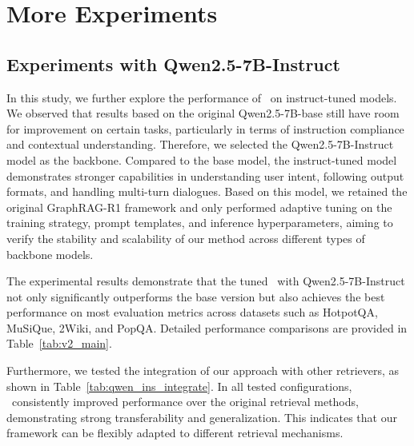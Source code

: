 








\section{More Experiments}

\subsection{Experiments with Qwen2.5-7B-Instruct}
In this study, we further explore the performance of \methodname~on instruct-tuned models. We observed that results based on the original Qwen2.5-7B-base still have room for improvement on certain tasks, particularly in terms of instruction compliance and contextual understanding. Therefore, we selected the Qwen2.5-7B-Instruct model as the backbone. Compared to the base model, the instruct-tuned model demonstrates stronger capabilities in understanding user intent, following output formats, and handling multi-turn dialogues. Based on this model, we retained the original GraphRAG-R1 framework and only performed adaptive tuning on the training strategy, prompt templates, and inference hyperparameters, aiming to verify the stability and scalability of our method across different types of backbone models.

The experimental results demonstrate that the tuned \methodname~with Qwen2.5-7B-Instruct not only significantly outperforms the base version but also achieves the best performance on most evaluation metrics across datasets such as HotpotQA, MuSiQue, 2Wiki, and PopQA. Detailed performance comparisons are provided in Table~\ref{tab:v2_main}.

Furthermore, we tested the integration of our approach with other retrievers, as shown in Table~\ref{tab:qwen_ins_integrate}. In all tested configurations, \methodname~consistently improved performance over the original retrieval methods, demonstrating strong transferability and generalization. This indicates that our framework can be flexibly adapted to different retrieval mechanisms.







